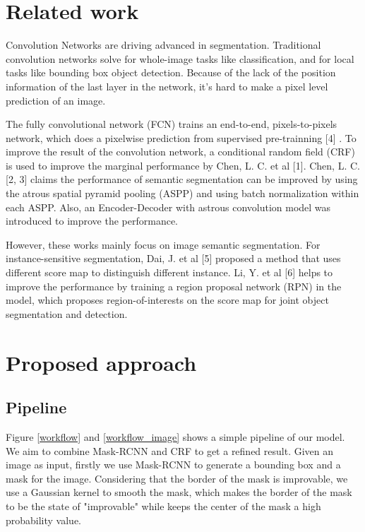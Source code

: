 \documentclass{article}
\begin{document}
\section{Related work}
Convolution Networks are driving advanced in segmentation. Traditional convolution networks solve for whole-image tasks like classification, and for local tasks like bounding box object detection. Because of the lack of the position information of the last layer in the network, it's hard to make a pixel level prediction of an image.

The fully convolutional network (FCN) trains an end-to-end, pixels-to-pixels network, which does a pixelwise prediction from supervised pre-trainning [4] . To improve the result of the convolution network, a conditional random field (CRF) is used to improve the marginal performance by Chen, L. C. et al [1]. Chen, L. C. [2, 3] claims the performance of semantic segmentation can be improved by using the atrous spatial pyramid pooling (ASPP) and using batch normalization within each ASPP. Also, an Encoder-Decoder with astrous convolution model was introduced to improve the performance. 

However, these works mainly focus on image semantic segmentation. For instance-sensitive segmentation, Dai, J. et al [5] proposed a method that uses different score map to distinguish different instance. Li, Y. et al [6] helps to improve the performance by training a region proposal network (RPN) in the model, which proposes region-of-interests on the score map for joint object segmentation and detection.


\section{Proposed approach}

\subsection{Pipeline}

Figure \ref{workflow} and \ref{workflow_image} shows a simple pipeline of our model. We aim to combine Mask-RCNN and CRF to get a refined result. Given an image as input, firstly we use Mask-RCNN to generate a bounding box and a mask for the image. Considering that the border of the mask is improvable, we use a Gaussian kernel to smooth the mask, which makes the border of the mask to be the state of "improvable" while keeps the center of the mask a high probability value.
\end{document}
